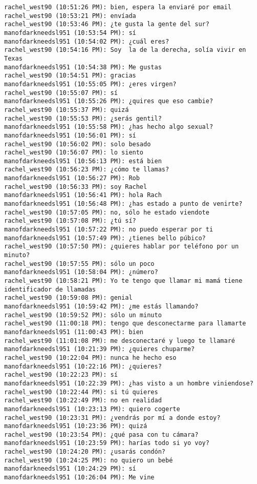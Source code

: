 \begin{verbatim}
rachel_west90 (10:51:26 PM): bien, espera la enviaré por email
rachel_west90 (10:53:21 PM): envíada
rachel_west90 (10:53:46 PM): ¿te gusta la gente del sur?
manofdarkneedsl951 (10:53:54 PM): sí
manofdarkneedsl951 (10:54:02 PM): ¿cuál eres?
rachel_west90 (10:54:16 PM): Soy  la de la derecha, solía vivir en Texas
manofdarkneedsl951 (10:54:38 PM): Me gustas
rachel_west90 (10:54:51 PM): gracias
manofdarkneedsl951 (10:55:05 PM): ¿eres virgen?
rachel_west90 (10:55:07 PM): sí
manofdarkneedsl951 (10:55:26 PM): ¿quires que eso cambie?
rachel_west90 (10:55:37 PM): quizá
rachel_west90 (10:55:53 PM): ¿serás gentil?
manofdarkneedsl951 (10:55:58 PM): ¿has hecho algo sexual?
manofdarkneedsl951 (10:56:01 PM): sí
rachel_west90 (10:56:02 PM): solo besado
rachel_west90 (10:56:07 PM): lo siento
manofdarkneedsl951 (10:56:13 PM): está bien
rachel_west90 (10:56:23 PM): ¿cómo te llamas?
manofdarkneedsl951 (10:56:27 PM): Rob
rachel_west90 (10:56:33 PM): soy Rachel
manofdarkneedsl951 (10:56:41 PM): hola Rach
manofdarkneedsl951 (10:56:48 PM): ¿has estado a punto de venirte?
rachel_west90 (10:57:05 PM): no, sólo he estado viendote
rachel_west90 (10:57:08 PM): ¿tú sí?
manofdarkneedsl951 (10:57:22 PM): no puedo esperar por ti
manofdarkneedsl951 (10:57:49 PM): ¿tienes bello púbico?
rachel_west90 (10:57:50 PM): ¿quieres hablar por teléfono por un minuto?
rachel_west90 (10:57:55 PM): sólo un poco
manofdarkneedsl951 (10:58:04 PM): ¿número?
rachel_west90 (10:58:21 PM): Yo te tengo que llamar mi mamá tiene identificador de llamadas
rachel_west90 (10:59:08 PM): genial
manofdarkneedsl951 (10:59:42 PM): ¿me estás llamando?
rachel_west90 (10:59:52 PM): sólo un minuto
rachel_west90 (11:00:18 PM): tengo que desconectarme para llamarte
manofdarkneedsl951 (11:00:43 PM): bien
rachel_west90 (11:01:08 PM): me desconectaré y luego te llamaré
manofdarkneedsl951 (10:21:39 PM): ¿quieres chuparme?
rachel_west90 (10:22:04 PM): nunca he hecho eso
manofdarkneedsl951 (10:22:16 PM): ¿quieres?
rachel_west90 (10:22:23 PM): sí
manofdarkneedsl951 (10:22:39 PM): ¿has visto a un hombre viniendose?
rachel_west90 (10:22:44 PM): si tú quieres
rachel_west90 (10:22:49 PM): no en realidad
manofdarkneedsl951 (10:23:13 PM): quiero cogerte
rachel_west90 (10:23:31 PM): ¿vendrás por mí a donde estoy?
manofdarkneedsl951 (10:23:36 PM): quizá
rachel_west90 (10:23:54 PM): ¿qué pasa con tu cámara?
manofdarkneedsl951 (10:23:59 PM): harías todo si yo voy?
rachel_west90 (10:24:20 PM): ¿usarás condón?
rachel_west90 (10:24:25 PM): no quiero un bebé
manofdarkneedsl951 (10:24:29 PM): sí
manofdarkneedsl951 (10:26:04 PM): Me vine
\end{verbatim}